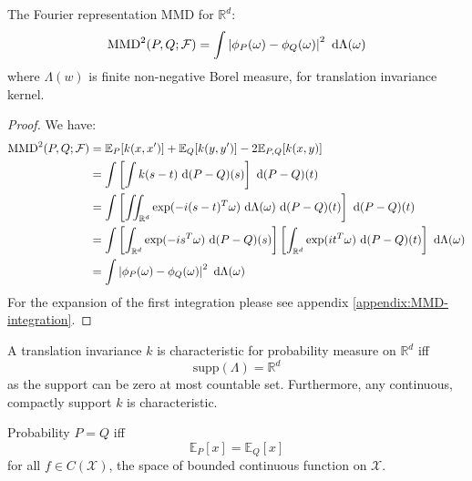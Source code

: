 \begin{theorem}
    The Fourier representation MMD for $\mathbb{R}^d$:
    \begin{equation*}
        \operatorname{MMD}^2(P, Q;\mathcal{F}) = \int \left| \phi_P(\omega) - \phi_Q(\omega) \right|^2\ \mathrm{d}\Lambda(\omega)
    \end{equation*}
    where $\Lambda(w)$ is finite non-negative Borel measure, for translation invariance kernel.
\end{theorem}
\begin{proof}
    We have:
    \begin{equation*}
    \begin{aligned}
        \operatorname{MMD}^2(P, Q;\mathcal{F}) &= \mathbb{E}_P[k(x, x')] + \mathbb{E}_Q[k(y,y')] - 2\mathbb{E}_{P, Q}[k(x, y)] \\ 
        &= \int\left[ \int k(s-t)\ \mathrm{d}(P-Q)(s) \right]\ \mathrm{d}(P-Q)(t) \\
        &= \int\left[ \iint_{\mathbb{R}^d}\exp(-i(s-t)^T\omega)\ \mathrm{d}\Lambda(\omega)\ \mathrm{d}(P-Q)(t) \right]\ \mathrm{d}(P-Q)(t) \\
        &=\int\left[ \int_{\mathbb{R}^d}\exp(-is^T\omega)\ \mathrm{d}(P-Q)(s) \right]\left[ \int_{\mathbb{R}^d}\exp(it^T\omega)\ \mathrm{d}(P-Q)(t) \right]\ \mathrm{d}\Lambda(\omega) \\
        &= \int \left| \phi_P(\omega) - \phi_Q(\omega) \right|^2 \ \mathrm{d}\Lambda(\omega) \\
    \end{aligned}
    \end{equation*}
    For the expansion of the first integration please see appendix \ref{appendix:MMD-integration}. 
\end{proof}

\begin{corollary}
    A translation invariance $k$ is characteristic for probability measure on $\mathbb{R}^d$ iff 
    \begin{equation*}
        \text{supp}(\Lambda) = \mathbb{R}^d
    \end{equation*}
    as the support can be zero at most countable set. Furthermore, any continuous, compactly support $k$ is characteristic.
\end{corollary}

\begin{theorem}
    Probability $P = Q$ iff 
    \begin{equation*}
        \mathbb{E}_{P}[x] = \mathbb{E}_Q[x]
    \end{equation*}
    for all $f\in C(\mathcal{X})$, the space of bounded continuous function on $\mathcal{X}$.
\end{theorem}

